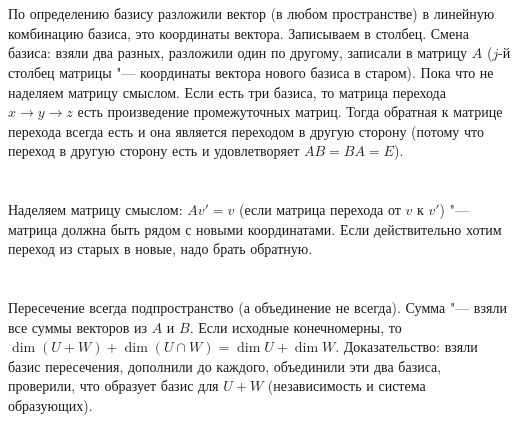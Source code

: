 \section{} %
По определению базису разложили вектор (в любом пространстве) в линейную комбинацию базиса, это координаты вектора.
Записываем в столбец.
Смена базиса: взяли два разных, разложили один по другому, записали в матрицу $A$ ($j$-й столбец матрицы "--- координаты вектора нового базиса в старом).
Пока что не наделяем матрицу смыслом.
Если есть три базиса, то матрица перехода $x \to y \to z$ есть произведение промежуточных матриц.
Тогда обратная к матрице перехода всегда есть и она является переходом в другую сторону (потому что переход в другую сторону есть и удовлетворяет $AB=BA=E$).

\section{} %
Наделяем матрицу смыслом: $Av'=v$ (если матрица перехода от $v$ к $v'$) "--- матрица должна быть рядом с новыми координатами.
Если действительно хотим переход из старых в новые, надо брать обратную.

\section{} %
Пересечение всегда подпространство (а объединение не всегда).
Сумма "--- взяли все суммы векторов из $A$ и $B$.
Если исходные конечномерны, то $\dim (U+W) + \dim(U\cap W) = \dim U + \dim W$.
Доказательство: взяли базис пересечения, дополнили до каждого, объединили эти два базиса, проверили, что образует базис для $U+W$ (независимость и система образующих).
